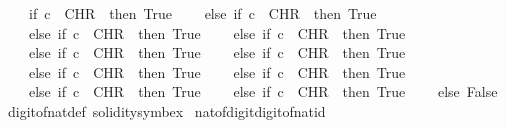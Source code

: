 \begin{isabellebody}
\ \ \ \ {\isacharparenleft}{\kern0pt}if\ c\ {\isacharequal}{\kern0pt}\ CHR\ {\isacharprime}{\kern0pt}{\isacharprime}{\kern0pt}{}{\isacharprime}{\kern0pt}{\isacharprime}{\kern0pt}\ then\ True\isanewline
\ \ \ \ else\ if\ c\ {\isacharequal}{\kern0pt}\ CHR\ {\isacharprime}{\kern0pt}{\isacharprime}{\kern0pt}{}{\isacharprime}{\kern0pt}{\isacharprime}{\kern0pt}\ then\ True\isanewline
\ \ \ \ else\ if\ c\ {\isacharequal}{\kern0pt}\ CHR\ {\isacharprime}{\kern0pt}{\isacharprime}{\kern0pt}{}{\isacharprime}{\kern0pt}{\isacharprime}{\kern0pt}\ then\ True\isanewline
\ \ \ \ else\ if\ c\ {\isacharequal}{\kern0pt}\ CHR\ {\isacharprime}{\kern0pt}{\isacharprime}{\kern0pt}{}{\isacharprime}{\kern0pt}{\isacharprime}{\kern0pt}\ then\ True\isanewline
\ \ \ \ else\ if\ c\ {\isacharequal}{\kern0pt}\ CHR\ {\isacharprime}{\kern0pt}{\isacharprime}{\kern0pt}{}{\isacharprime}{\kern0pt}{\isacharprime}{\kern0pt}\ then\ True\isanewline
\ \ \ \ else\ if\ c\ {\isacharequal}{\kern0pt}\ CHR\ {\isacharprime}{\kern0pt}{\isacharprime}{\kern0pt}{}{\isacharprime}{\kern0pt}{\isacharprime}{\kern0pt}\ then\ True\isanewline
\ \ \ \ else\ if\ c\ {\isacharequal}{\kern0pt}\ CHR\ {\isacharprime}{\kern0pt}{\isacharprime}{\kern0pt}{}{\isacharprime}{\kern0pt}{\isacharprime}{\kern0pt}\ then\ True\isanewline
\ \ \ \ else\ if\ c\ {\isacharequal}{\kern0pt}\ CHR\ {\isacharprime}{\kern0pt}{\isacharprime}{\kern0pt}{}{\isacharprime}{\kern0pt}{\isacharprime}{\kern0pt}\ then\ True\isanewline
\ \ \ \ else\ if\ c\ {\isacharequal}{\kern0pt}\ CHR\ {\isacharprime}{\kern0pt}{\isacharprime}{\kern0pt}{}{\isacharprime}{\kern0pt}{\isacharprime}{\kern0pt}\ then\ True\isanewline
\ \ \ \ else\ if\ c\ {\isacharequal}{\kern0pt}\ CHR\ {\isacharprime}{\kern0pt}{\isacharprime}{\kern0pt}{}{\isacharprime}{\kern0pt}{\isacharprime}{\kern0pt}\ then\ True\isanewline
\ \ \ \ else\ False{\isacharparenright}{\kern0pt}{\isacartoucheclose}\isanewline
\isanewline
\isanewline
\isanewline
\isanewline
{}\isamarkupfalse%
\ digit{\isacharunderscore}{\kern0pt}of{\isacharunderscore}{\kern0pt}nat{\isacharunderscore}{\kern0pt}def\ {\isacharbrackleft}{\kern0pt}solidity{\isacharunderscore}{\kern0pt}symbex{\isacharbrackright}{\kern0pt}\isanewline
\isanewline
{}\isamarkupfalse%
\ nat{\isacharunderscore}{\kern0pt}of{\isacharunderscore}{\kern0pt}digit{\isacharunderscore}{\kern0pt}digit{\isacharunderscore}{\kern0pt}of{\isacharunderscore}{\kern0pt}nat{\isacharunderscore}{\kern0pt}id{\isacharcolon}{\kern0pt}\ \isanewline

\end{isabellebody}
